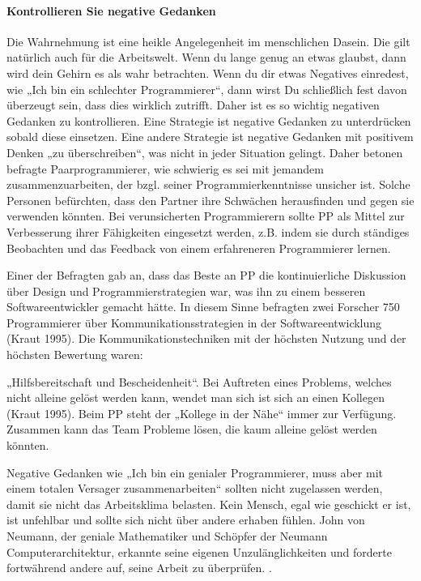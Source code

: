 \paragraph {Kontrollieren Sie negative Gedanken} Die Wahrnehmung ist eine heikle Angelegenheit im menschlichen Dasein. Die gilt natürlich auch für die Arbeitswelt. Wenn du lange genug an etwas glaubst, dann wird dein Gehirn es als wahr betrachten. Wenn du dir etwas Negatives einredest, wie „Ich bin ein schlechter Programmierer“, dann wirst Du schließlich fest davon überzeugt sein, dass dies wirklich zutrifft. Daher ist es so wichtig negativen Gedanken zu kontrollieren. Eine Strategie ist negative Gedanken zu unterdrücken sobald diese einsetzen. Eine andere Strategie ist negative Gedanken mit positivem Denken „zu überschreiben“, was nicht in jeder Situation gelingt.  Daher betonen befragte Paarprogrammierer, wie schwierig es sei mit jemandem zusammenzuarbeiten, der bzgl. seiner Programmierkenntnisse unsicher ist. Solche Personen befürchten, dass den Partner ihre Schwächen herausfinden und gegen sie verwenden könnten. Bei verunsicherten Programmierern sollte PP als Mittel zur Verbesserung ihrer Fähigkeiten eingesetzt werden, z.B. indem sie durch ständiges Beobachten und das Feedback von einem erfahreneren Programmierer lernen.


Einer der Befragten gab an, dass das Beste an PP die kontinuierliche Diskussion über Design und Programmierstrategien  war, was ihn zu einem besseren Softwareentwickler gemacht hätte. In diesem Sinne befragten zwei Forscher 750 Programmierer über Kommunikationsstrategien in der Softwareentwicklung (Kraut 1995). Die Kommunikationstechniken mit der höchsten Nutzung und der höchsten Bewertung waren:

„Hilfsbereitschaft und Bescheidenheit“. Bei Auftreten eines Problems, welches nicht alleine gelöst werden kann, wendet man sich ist sich an einen Kollegen (Kraut 1995). Beim PP steht der „Kollege in der Nähe“ immer zur Verfügung. Zusammen kann das Team Probleme lösen, die kaum alleine gelöst werden könnten.

Negative Gedanken wie „Ich bin ein genialer Programmierer, muss aber mit einem totalen Versager zusammenarbeiten“ sollten nicht zugelassen werden, damit sie nicht das Arbeitsklima belasten. Kein Mensch, egal wie geschickt er ist, ist unfehlbar und sollte sich nicht über andere erhaben fühlen. John von Neumann, der geniale Mathematiker und Schöpfer der Neumann Computerarchitektur, erkannte seine eigenen Unzulänglichkeiten und forderte fortwährend andere auf, seine Arbeit zu überprüfen.
 \cite{Williams2000AllKindergarten}.


